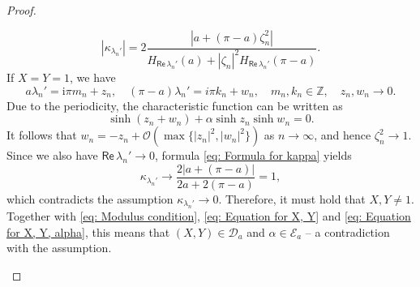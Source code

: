 \documentclass[11pt, a4paper,reqno]{amsart}
\theoremstyle{plain}
\theoremstyle{definition}
\theoremstyle{remark}
\newcommand{\1}{\mathds 1}
\renewcommand{\Re}{\mathsf{Re}\,}
\begin{document}
\begin{proof}
\begin{enumerate}
\begin{equation}
        |\kappa_{\lambda_n'}| = 2\frac{|a + (\pi-a)\zeta_n^2|}{H_{\Re \lambda_n'}(a) + |\zeta_n|^2H_{\Re \lambda_n'}(\pi-a)}.
        \label{eq: Formula for kappa}
        \end{equation}
        If $X = Y = 1$, we have
        \[
        a\lambda_n' = \mathrm{i}\pi m_n + z_n, \quad (\pi-a)\lambda_n' = i\pi k_n + w_n, \quad m_n, k_n \in \mathbb Z, \quad z_n, w_n \to 0.
        \]
        Due to the periodicity, the characteristic function can be written as
        \[
        \sinh(z_n + w_n) + \alpha \sinh z_n\sinh w_n = 0.
        \]
        It follows that $w_n = -z_n + \mathcal O(\max\{|z_n|^2, |w_n|^2\})$ as $n \to \infty$, and hence $\zeta_n^2 \to 1$. Since we also have $\Re \lambda_n' \to 0$, formula \eqref{eq: Formula for kappa} yields
        \[
        \kappa_{\lambda_n'} \to \frac{2|a + (\pi-a)|}{2a + 2(\pi-a)} = 1,
        \]
        which contradicts the assumption $\kappa_{\lambda_n'} \to 0$. Therefore, it must hold that $X, Y \neq 1$. Together with  \eqref{eq: Modulus condition}, \eqref{eq: Equation for X, Y} and \eqref{eq: Equation for X, Y, alpha}, this means that $(X, Y) \in \mathcal D_a$ and $\alpha \in \mathcal E_a$ -- a contradiction with the assumption.


\end{enumerate}
\end{proof}
\end{document}
